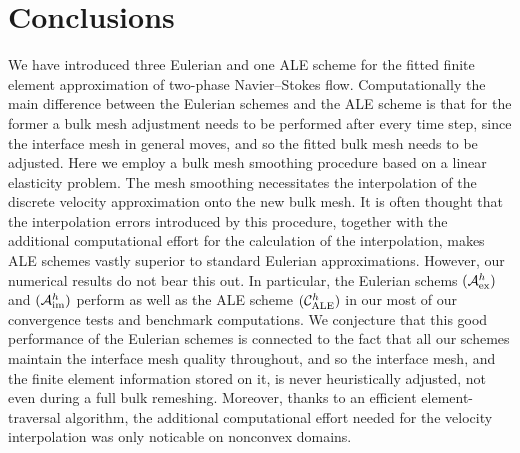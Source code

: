 \documentclass[a4paper,12pt,onecolumn]{article}
\newcommand{\schemeAex}{{\mathcal{A}^h_{\rm ex}}}
\newcommand{\schemeAim}{{\mathcal{A}^h_{\rm im}}}
\newcommand{\schemeALE}{{\mathcal{C}^h_{\rm ALE}}}
\begin{document}
\section*{Conclusions}
We have introduced three Eulerian and one ALE scheme for the fitted finite
element approximation of two-phase Navier--Stokes flow. Computationally the
main difference between the Eulerian schemes and the ALE scheme is that
for the former a bulk mesh adjustment needs to be performed after every time
step, since the interface mesh in general moves, and so the fitted bulk mesh
needs to be adjusted. Here we employ a bulk mesh smoothing procedure based
on a linear elasticity problem. The mesh smoothing necessitates the
interpolation of the discrete velocity approximation onto the new bulk mesh.
It is often thought that the interpolation errors introduced by this procedure,
together with the additional computational effort for the calculation of the
interpolation, makes ALE schemes vastly superior to standard Eulerian
approximations. However, our numerical results do not bear this out.
In particular, the Eulerian schems $(\schemeAex)$ and $(\schemeAim)$ perform
as well as the ALE scheme $(\schemeALE)$ in our most of our convergence tests
and benchmark computations. We conjecture that this good performance of
the Eulerian schemes is connected to the fact that all our schemes
maintain the interface mesh quality throughout, and so the
interface mesh, and the finite element information stored on it,
is never heuristically adjusted, not even during a full bulk remeshing.
Moreover, thanks to an efficient element-traversal
algorithm, the additional computational effort needed
for the velocity interpolation was only noticable on nonconvex domains.



\end{document}
